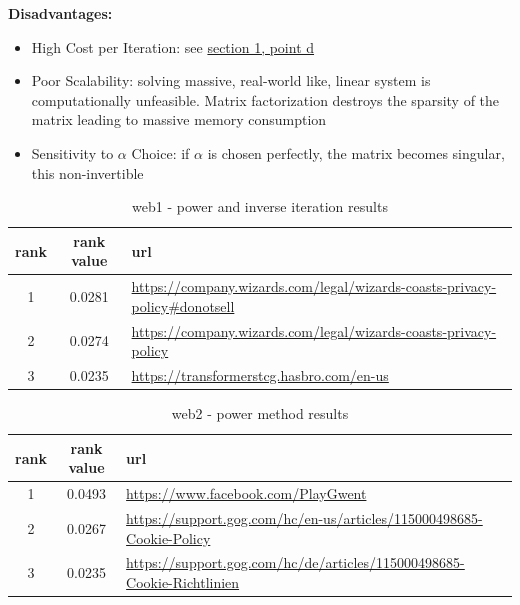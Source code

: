 \documentclass[unicode,11pt,a4paper,oneside,numbers=endperiod,openany]{scrartcl}
\begin{document}
\textbf{Disadvantages:}
\begin{itemize}
    \item High Cost per Iteration: see \hyperref[qst:perf]{section 1, point d}
    \item Poor Scalability: solving massive, real-world like, linear system is computationally unfeasible. Matrix factorization destroys the sparsity of the matrix leading to massive memory consumption
    \item Sensitivity to $\alpha$ Choice: if $\alpha$ is chosen perfectly, the matrix becomes singular, this non-invertible
\end{itemize}

{
\hypersetup{hidelinks}
\begin{table}[htb!]
    \centering
    \begin{tabular}{ccp{10cm}}
        \toprule
        \textbf{rank} & \textbf{rank value} & \textbf{url} \\ 
        \midrule
        1 & 0.0281 & \url{https://company.wizards.com/legal/wizards-coasts-privacy-policy#donotsell} \\
        2 & 0.0274 & \url{https://company.wizards.com/legal/wizards-coasts-privacy-policy} \\
        3 & 0.0235 & \url{https://transformerstcg.hasbro.com/en-us} \\ 
        \bottomrule
    \end{tabular}
    \caption{web1 - power and inverse iteration results}
\end{table}

\begin{table}[htb!]
    \centering
    \begin{tabular}{ccp{10cm}}
        \toprule
        \textbf{rank} & \textbf{rank value} & \textbf{url} \\ 
        \midrule
        1 & 0.0493 & \url{https://www.facebook.com/PlayGwent} \\
        2 & 0.0267 & \url{https://support.gog.com/hc/en-us/articles/115000498685-Cookie-Policy} \\
        3 & 0.0235 & \url{https://support.gog.com/hc/de/articles/115000498685-Cookie-Richtlinien} \\ 
        \bottomrule
    \end{tabular}
    \caption{web2 - power method results}
\end{table}

}
\end{document}
